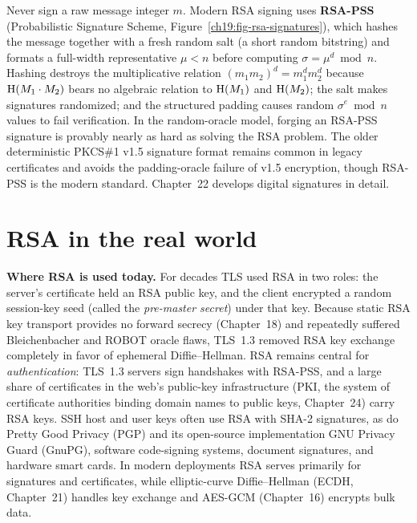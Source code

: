 \begin{trapbox}
Never sign a raw message integer $m$. Modern RSA signing uses \textbf{RSA-PSS} (Probabilistic Signature Scheme, Figure~\ref{ch19:fig-rsa-signatures}), which hashes the message together with a fresh random salt (a short random bitstring) and formats a full-width representative $\mu < n$ before computing $\sigma = \mu^d \bmod n$. Hashing destroys the multiplicative relation $(m_1 m_2)^d = m_1^d m_2^d$ because $\operatorname{H}(M_1 \cdot M_2)$ bears no algebraic relation to $\operatorname{H}(M_1)$ and $\operatorname{H}(M_2)$; the salt makes signatures randomized; and the structured padding causes random $\sigma^e \bmod n$ values to fail verification. In the random-oracle model, forging an RSA-PSS signature is provably nearly as hard as solving the RSA problem. The older deterministic PKCS\#1 v1.5 signature format remains common in legacy certificates and avoids the padding-oracle failure of v1.5 encryption, though RSA-PSS is the modern standard. Chapter~22 develops digital signatures in detail.
\end{trapbox}

\section{RSA in the real world}
\label{ch19:realworld}

\begin{applicationbox}
\textbf{Where RSA is used today.} For decades TLS used RSA in two roles: the server's certificate held an RSA public key, and the client encrypted a random session-key seed (called the \emph{pre-master secret}) under that key. Because static RSA key transport provides no forward secrecy (Chapter~18) and repeatedly suffered Bleichenbacher and ROBOT oracle flaws, TLS~1.3 removed RSA key exchange completely in favor of ephemeral Diffie--Hellman. RSA remains central for \emph{authentication}: TLS~1.3 servers sign handshakes with RSA-PSS, and a large share of certificates in the web's public-key infrastructure (PKI, the system of certificate authorities binding domain names to public keys, Chapter~24) carry RSA keys. SSH host and user keys often use RSA with SHA-2 signatures, as do Pretty Good Privacy (PGP) and its open-source implementation GNU Privacy Guard (GnuPG), software code-signing systems, document signatures, and hardware smart cards. In modern deployments RSA serves primarily for signatures and certificates, while elliptic-curve Diffie--Hellman (ECDH, Chapter~21) handles key exchange and AES-GCM (Chapter~16) encrypts bulk data.
\end{applicationbox}

